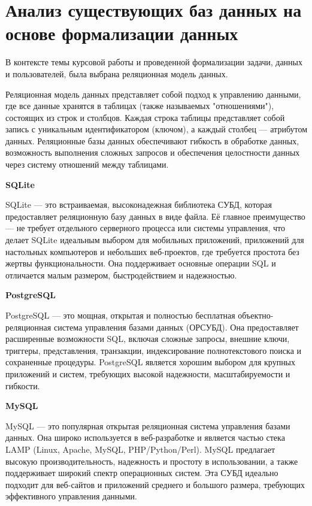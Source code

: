 \clearpage 


\section{Анализ существующих баз данных на основе формализации данных}

В контексте темы курсовой работы и проведенной формализации задачи, данных и пользователей, была выбрана реляционная модель данных.

Реляционная модель данных представляет собой подход к управлению данными, где все данные хранятся в таблицах (также называемых "отношениями"), состоящих из строк и столбцов. Каждая строка таблицы представляет собой запись с уникальным идентификатором (ключом), а каждый столбец — атрибутом данных. Реляционные базы данных обеспечивают гибкость в обработке данных, возможность выполнения сложных запросов и обеспечения целостности данных через систему отношений между таблицами.

\textbf{SQLite}

SQLite — это встраиваемая, высоконадежная библиотека СУБД, которая предоставляет реляционную базу данных в виде файла. Её главное преимущество — не требует отдельного серверного процесса или системы управления, что делает SQLite идеальным выбором для мобильных приложений, приложений для настольных компьютеров и небольших веб-проектов, где требуется простота без жертвы функциональности. Она поддерживает основные операции SQL и отличается малым размером, быстродействием и надежностью.

\textbf{PostgreSQL}

PostgreSQL — это мощная, открытая и полностью бесплатная объектно-реляционная система управления базами данных (ОРСУБД). Она предоставляет расширенные возможности SQL, включая сложные запросы, внешние ключи, триггеры, представления, транзакции, индексирование полнотекстового поиска и сохраненные процедуры. PostgreSQL является хорошим выбором для крупных приложений и систем, требующих высокой надежности, масштабируемости и гибкости.

\textbf{MySQL}

MySQL — это популярная открытая реляционная система управления базами данных. Она широко используется в веб-разработке и является частью стека LAMP (Linux, Apache, MySQL, PHP/Python/Perl). MySQL предлагает высокую производительность, надежность и простоту в использовании, а также поддерживает широкий спектр операционных систем. Эта СУБД идеально подходит для веб-сайтов и приложений среднего и большого размера, требующих эффективного управления данными.


